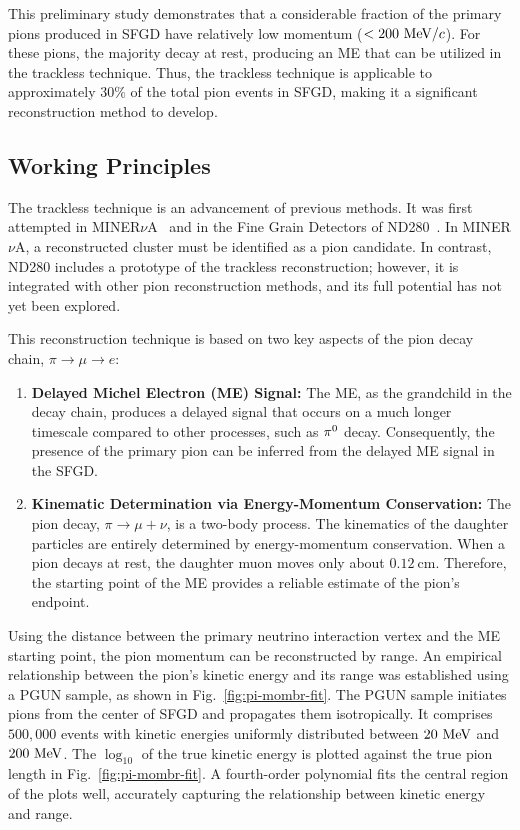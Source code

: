           This preliminary study demonstrates that a considerable fraction of the primary pions produced in SFGD have relatively low momentum ($<200~\textrm{MeV}/c$). 
          For these pions, the majority decay at rest, producing an ME that can be utilized in the trackless technique. 
          Thus, the trackless technique is applicable to approximately $30\%$ of the total pion events in SFGD, making it a significant reconstruction method to develop.

     \subsection{Working Principles}
     \label{sec:tl-wp}
          The trackless technique is an advancement of previous methods. 
          It was first attempted in MINER$\nu$A~\cite{poster:minerva-pime} and in the Fine Grain Detectors of ND280~\cite{poster:minerva-pime}. 
          In MINER$\nu$A, a reconstructed cluster must be identified as a pion candidate. 
          In contrast, ND280 includes a prototype of the trackless reconstruction; however, it is integrated with other pion reconstruction methods, and its full potential has not yet been explored.

          This reconstruction technique is based on two key aspects of the pion decay chain, $\pi \rightarrow \mu \rightarrow e$:

          \begin{enumerate}
          \item \textbf{Delayed Michel Electron (ME) Signal:} The ME, as the grandchild in the decay chain, produces a delayed signal that occurs on a much longer timescale compared to other processes, such as $\pi^0$ decay. 
          Consequently, the presence of the primary pion can be inferred from the delayed ME signal in the SFGD.
          
          \item \textbf{Kinematic Determination via Energy-Momentum Conservation:} The pion decay, $\pi \rightarrow \mu + \nu$, is a two-body process. 
          The kinematics of the daughter particles are entirely determined by energy-momentum conservation. 
          When a pion decays at rest, the daughter muon moves only about $0.12~\textrm{cm}$. 
          Therefore, the starting point of the ME provides a reliable estimate of the pion's endpoint.
          \end{enumerate}

          Using the distance between the primary neutrino interaction vertex and the ME starting point, the pion momentum can be reconstructed by range. 
          An empirical relationship between the pion's kinetic energy and its range was established using a PGUN sample, as shown in Fig.~\ref{fig:pi-mombr-fit}. 
          The PGUN sample initiates pions from the center of SFGD and propagates them isotropically. 
          It comprises $500,000$ events with kinetic energies uniformly distributed between $20~\textrm{MeV}$ and $200~\textrm{MeV}$. 
          The $\log_{10}$ of the true kinetic energy is plotted against the true pion length in Fig.~\ref{fig:pi-mombr-fit}. 
          A fourth-order polynomial fits the central region of the plots well, accurately capturing the relationship between kinetic energy and range.

